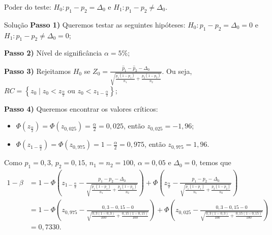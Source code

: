 \documentclass[9pt]{beamer}
\begin{document}
\begin{frame}{Poder do teste: $H_0:p_1 - p_2 = \Delta_0$ e $H_1: p_1 - p_2 \neq \Delta_0$.}

\small

\begin{block}{Solução}
	\textbf{Passo 1)} Queremos testar as seguintes hipóteses: $H_0: p_1 - p_2 = \Delta_0=0$ e $H_1: p_1 - p_2 \neq \Delta_0=0$;
	
	\textbf{Passo 2)} Nível de significância $\alpha=5\%$;
	
	\textbf{Passo 3)} Rejeitamos $H_0$ se $Z_0 = \frac{\hat{p}_1 - \hat{p}_2 - \Delta_0}{\sqrt{\frac{p_1(1-p_1)}{n_1} + \frac{p_2(1-p_2)}{n_2}}}$. Ou seja, $RC = \left\{ z_0 \mid z_0 < z_\frac{\alpha}{2} \mbox{ ou } z_0 < z_{1-\frac{\alpha}{2}} \right\}$;
	
	\textbf{Passo 4)} Queremos encontrar os valores críticos:
	\begin{itemize}
		\item $\Phi\left( z_\frac{\alpha}{2}\right) = \Phi\left( z_{0,025}\right) = \frac{\alpha}{2} = 0,025$, então $z_{0,025} = -1,96$;
		\item $\Phi\left( z_{1-\frac{\alpha}{2}}\right) = \Phi\left( z_{0,975}\right) =1- \frac{\alpha}{2} = 0,975$, então $z_{0,975} = 1,96$.
	\end{itemize}
\end{block}

Como $p_1 = 0,3$, $p_2=0,15$, $n_1=n_2=100$, $\alpha = 0,05$ e $\Delta_0=0$, temos que
\tiny
\begin{align*}
	1-\beta &= 1 - \Phi\left( z_{1-\frac{\alpha}{2}} - \frac{p_1-p_2 - \Delta_0}{\sqrt{\frac{p_1(1-p_1)}{n_1} + \frac{p_2(1-p_2)}{n_2}}} \right) + \Phi\left( z_{\frac{\alpha}{2}} - \frac{p_1-p_2 - \Delta_0}{\sqrt{\frac{p_1(1-p_1)}{n_1} + \frac{p_2(1-p_2)}{n_2}}} \right)\\
	&= 1 - \Phi\left( z_{0,975} - \frac{0,3-0,15 - 0}{\sqrt{\frac{0,3(1-0,3)}{100} + \frac{0,15(1-0,15)}{100}}} \right) + \Phi\left( z_{0,025} - \frac{0,3-0,15 - 0}{\sqrt{\frac{0,3(1-0,3)}{100} + \frac{0,15(1-0,15)}{100}}} \right)\\
	&= 0,7330.
\end{align*}
\normalsize
\end{frame}
\end{document}
